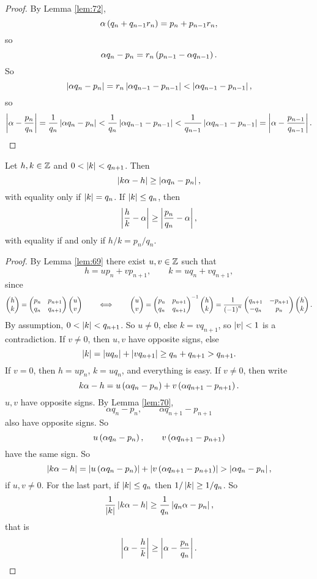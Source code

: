\begin{proof}
By Lemma \ref{lem:72},
$$ \alpha\left( q_n + q_{n - 1}r_n \right) = p_n + p_{n - 1}r_n, $$
so
$$ \alpha q_n - p_n = r_n\left( p_{n - 1} - \alpha q_{n - 1} \right). $$
So
$$ \left\lvert \alpha q_n - p_n \right\rvert = r_n\left\lvert \alpha q_{n - 1} - p_{n - 1} \right\rvert < \left\lvert \alpha q_{n - 1} - p_{n - 1} \right\rvert, $$
so
$$ \left\lvert \alpha - \dfrac{p_n}{q_n} \right\rvert = \dfrac{1}{q_n}\left\lvert \alpha q_n - p_n \right\rvert < \dfrac{1}{q_n}\left\lvert \alpha q_{n - 1} - p_{n - 1} \right\rvert < \dfrac{1}{q_{n - 1}}\left\lvert \alpha q_{n - 1} - p_{n - 1} \right\rvert = \left\lvert \alpha - \dfrac{p_{n - 1}}{q_{n - 1}} \right\rvert. $$
\end{proof}

\begin{theorem}
\label{thm:74}
Let $ h, k \in \mathbb{Z} $ and $ 0 < \left\lvert k \right\rvert < q_{n + 1} $. Then
$$ \left\lvert k\alpha - h \right\rvert \ge \left\lvert \alpha q_n - p_n \right\rvert, $$
with equality only if $ \left\lvert k \right\rvert = q_n $. If $ \left\lvert k \right\rvert \le q_n $, then
$$ \left\lvert \dfrac{h}{k} - \alpha \right\rvert \ge \left\lvert \dfrac{p_n}{q_n} - \alpha \right\rvert, $$
with equality if and only if $ h / k = p_n / q_n $.
\end{theorem}

\begin{proof}
By Lemma \ref{lem:69} there exist $ u, v \in \mathbb{Z} $ such that
$$ h = up_n + vp_{n + 1}, \qquad k = uq_n + vq_{n + 1}, $$
since
$$ \begin{pmatrix} h \\ k \end{pmatrix} = \begin{pmatrix} p_n & p_{n + 1} \\ q_n & q_{n + 1} \end{pmatrix}\begin{pmatrix} u \\ v \end{pmatrix} \qquad \iff \qquad \begin{pmatrix} u \\ v \end{pmatrix} = \begin{pmatrix} p_n & p_{n + 1} \\ q_n & q_{n + 1} \end{pmatrix}^{-1}\begin{pmatrix} h \\ k \end{pmatrix} = \dfrac{1}{\left( -1 \right)^n}\begin{pmatrix} q_{n + 1} & -p_{n + 1} \\ -q_n & p_n \end{pmatrix}\begin{pmatrix} h \\ k \end{pmatrix}. $$
By assumption, $ 0 < \left\lvert k \right\rvert < q_{n + 1} $. So $ u \ne 0 $, else $ k = vq_{n + 1} $, so $ \left\lvert v \right\rvert < 1 $ is a contradiction. If $ v \ne 0 $, then $ u, v $ have opposite signs, else
$$ \left\lvert k \right\rvert = \left\lvert uq_n \right\rvert + \left\lvert vq_{n + 1} \right\rvert \ge q_n + q_{n + 1} > q_{n + 1}. $$
If $ v = 0 $, then $ h = up_n $, $ k = uq_n $, and everything is easy. If $ v \ne 0 $, then write
$$ k\alpha - h = u\left( \alpha q_n - p_n \right) + v\left( \alpha q_{n + 1} - p_{n + 1} \right). $$
$ u, v $ have opposite signs. By Lemma \ref{lem:70},
$$ \alpha q_n - p_n, \qquad \alpha q_{n + 1} - p_{n + 1} $$
also have opposite signs. So
$$ u\left( \alpha q_n - p_n \right), \qquad v\left( \alpha q_{n + 1} - p_{n + 1} \right) $$
have the same sign. So
$$ \left\lvert k\alpha - h \right\rvert = \left\lvert u\left( \alpha q_n - p_n \right) \right\rvert + \left\lvert v\left( \alpha q_{n + 1} - p_{n + 1} \right) \right\rvert > \left\lvert \alpha q_n - p_n \right\rvert, $$
if $ u, v \ne 0 $. For the last part, if $ \left\lvert k \right\rvert \le q_n $ then $ 1 / \left\lvert k \right\rvert \ge 1 / q_n $. So
$$ \dfrac{1}{\left\lvert k \right\rvert}\left\lvert k\alpha - h \right\rvert \ge \dfrac{1}{q_n}\left\lvert q_n\alpha - p_n \right\rvert, $$
that is
$$ \left\lvert \alpha - \dfrac{h}{k} \right\rvert \ge \left\lvert \alpha - \dfrac{p_n}{q_n} \right\rvert. $$
\end{proof}

